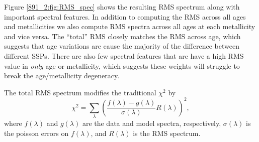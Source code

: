 
Figure \ref{891_2:fig:RMS_spec} shows the resulting RMS spectrum along with
important spectral features. In addition to computing the RMS across
all ages and metallicities we also compute RMS spectra across all ages
at each metallicity and vice versa. The ``total'' RMS closely matches
the RMS across age, which suggests that age variations are cause the
majority of the difference between different SSPs. There are also few
spectral features that are have a high RMS value in \emph{only} age or
metallicity, which suggests these weights will struggle to break the
age/metallicity degeneracy.

The total RMS spectrum modifies the traditional $\chi^2$ by
\begin{equation}
\label{891_2:eq:smart_chi}
\chi^2 = \sum_{\lambda}\left(\frac{f(\lambda) -
  g(\lambda)}{\sigma(\lambda)}R(\lambda)\right)^2,
\end{equation}
where $f(\lambda)$ and $g(\lambda)$ are the data and model spectra,
respectively, $\sigma(\lambda)$ is the poisson errors on $f(\lambda)$, and
$R(\lambda)$ is the RMS spectrum.



